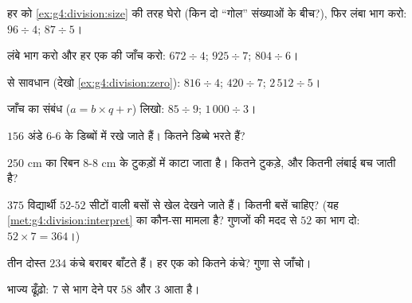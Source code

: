 \begin{exercise}[$\star$]\label{exo:g4:division:1}
हर  को \cref{ex:g4:division:size} की तरह घेरो (किन दो
``गोल'' संख्याओं के बीच?), फिर लंबा भाग करो:
$96 \div 4$; \quad $87 \div 5$।
\end{exercise}

\begin{exercise}[$\star$]\label{exo:g4:division:2}
लंबे भाग करो और हर एक की जाँच करो:
$672 \div 4$; \quad $925 \div 7$; \quad $804 \div 6$।
\end{exercise}

\begin{exercise}[$\star$]\label{exo:g4:division:3}
 से सावधान (देखो \cref{ex:g4:division:zero}):
$816 \div 4$; \quad $420 \div 7$; \quad $2\,512 \div 5$।
\end{exercise}

\begin{exercise}[$\star$]\label{exo:g4:division:4}
जाँच का संबंध ($a = b \times q + r$) लिखो: $85 \div 9$;
\quad $1\,000 \div 3$।
\end{exercise}

\begin{exercise}[$\star$]\label{exo:g4:division:5}
$156$ अंडे $6$-$6$ के डिब्बों में रखे जाते हैं। कितने डिब्बे भरते हैं?
\end{exercise}

\begin{exercise}[$\star$]\label{exo:g4:division:6}
$250$ cm का रिबन $8$-$8$ cm के टुकड़ों में काटा जाता है। कितने
टुकड़े, और कितनी लंबाई बच जाती है?
\end{exercise}

\begin{exercise}[$\star$]\label{exo:g4:division:7}
$375$ विद्यार्थी $52$-$52$ सीटों वाली बसों से खेल देखने जाते
हैं। कितनी बसें चाहिए? (यह
\cref{met:g4:division:interpret} का कौन-सा मामला है? गुणजों की
मदद से $52$ का भाग दो: $52 \times 7 = 364$।)
\end{exercise}

\begin{exercise}[$\star$]\label{exo:g4:division:8}
तीन दोस्त $234$ कंचे बराबर बाँटते हैं। हर एक को कितने कंचे?
गुणा से जाँचो।
\end{exercise}

\begin{exercise}[$\star$]\label{exo:g4:division:9}
भाज्य ढूँढ़ो: $7$ से भाग देने पर  $58$ और
 $3$ आता है।
\end{exercise}

